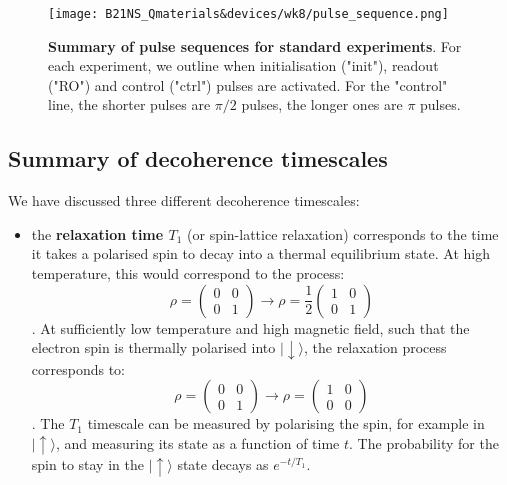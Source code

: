 \documentclass[a4paper,11pt]{article}
\newcommand{\ket}[1]{| #1 \rangle}
\begin{document}
\begin{figure}[h]
\centering
\texttt{[image: B21NS\_Qmaterials\&devices/wk8/pulse\_sequence.png]}
\caption{{\bf Summary of pulse sequences for standard experiments}. For each experiment, we outline when initialisation ("init"), readout ("RO") and control ("ctrl") pulses are activated. For the "control" line, the shorter pulses are $\pi/2$ pulses, the longer ones are $\pi$ pulses. }
\label{fig:pulse_sequences}
\end{figure}

\subsection {Summary of decoherence timescales}
We have discussed three different decoherence timescales:
\begin{itemize}
    \item the {\bf relaxation time $T_1$} (or spin-lattice relaxation) corresponds to the time it takes a polarised spin to decay into a thermal equilibrium state. At high temperature, this would correspond to the process:
    \begin{equation}
    \rho = \left(\begin{array}{cc}
        0 & 0\\
        0 & 1\end{array} \right) 
        \longrightarrow 
        \rho = \frac{1}{2} \left(\begin{array}{cc}
        1 & 0\\
        0 & 1\end{array} \right) 
    \end{equation}.
    At sufficiently low temperature and high magnetic field, such that the electron spin is thermally polarised into $\ket{\downarrow}$, the relaxation process corresponds to:
    \begin{equation}
    \rho = \left(\begin{array}{cc}
        0 & 0\\
        0 & 1\end{array} \right) 
        \longrightarrow 
        \rho =  \left(\begin{array}{cc}
        1 & 0\\
        0 & 0\end{array} \right) 
    \end{equation}.    
    The $T_1$ timescale can be measured by polarising the spin, for example in $\ket{\uparrow}$, and measuring its state as a function of time $t$. The probability for the spin to stay in the $\ket{\uparrow}$ state decays as $e^{-t/T_1}$.
    

\end{itemize}
\end{document}
